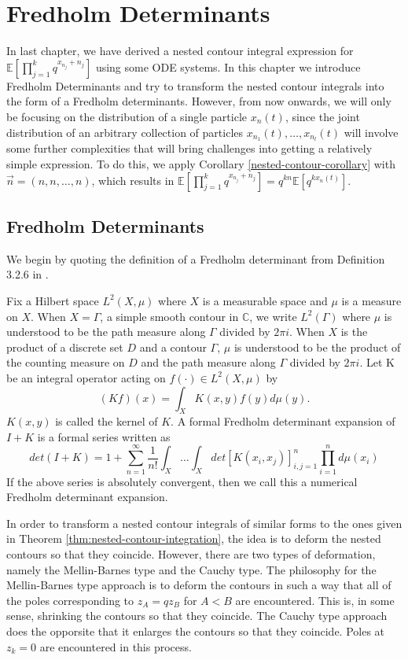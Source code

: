 \chapter{Fredholm Determinants}
In last chapter, we have derived a nested contour integral expression for $\mathbb{E}[\prod_{j=1}^k q^{x_{n_j}+n_j}]$ using some ODE systems. In this chapter we introduce Fredholm Determinants and try to transform the nested contour integrals into the form of a Fredholm determinants. However, from now onwards, we will only be focusing on the distribution of a single particle $x_n(t)$, since the joint distribution of an arbitrary collection of particles $x_{n_1}(t), \dots, x_{n_l}(t)$ will involve some further complexities that will bring challenges into getting a relatively simple expression. To do this, we apply Corollary \ref{nested-contour-corollary} with $\vec{n} = (n,n,\dots, n)$, which results in $\mathbb{E}[\prod_{j=1}^k q^{x_{n_j}+n_j}] = q^{kn} \mathbb{E} [q^{kx_n(t)}]$. 

\section{Fredholm Determinants}
We begin by quoting the definition of a Fredholm determinant from Definition 3.2.6 in \cite{macdonald2014}.

\begin{definition}
Fix a Hilbert space $L^2(X,\mu)$ where $X$ is a measurable space and $\mu$ is a measure on $X$. When $X = \Gamma$, a simple smooth contour in $\mathbb{C}$, we write $L^2(\Gamma)$ where $\mu$ is understood to be the path measure along $\Gamma$ divided by $2 \pi i$. When $X$ is the product of a discrete set $D$ and a contour $\Gamma$, $\mu$ is understood to be the product of the counting measure on $D$ and the path measure along $\Gamma$ divided by $2 \pi i$.
Let K be an integral operator acting on $f(\cdot) \in L^2(X,\mu)$ by $$(Kf)(x) = \int_X K(x,y) f(y) d\mu(y).$$ $K(x,y)$ is called the kernel of $K$. A formal Fredholm determinant expansion of $I+K$ is a formal series written as $$det(I+K) = 1 + \sum_{n=1}^{\infty} \frac{1}{n!} \int_X \dots \int_X det[K(x_i,x_j)]_{i,j=1}^{n} \prod_{i=1}^{n} d\mu(x_i)$$
If the above series is absolutely convergent, then we call this a numerical Fredholm determinant expansion.
\end{definition}

In order to transform a nested contour integrals of similar forms to the ones given in Theorem \ref{thm:nested-contour-integration}, the idea is to deform the nested contours so that they coincide. However, there are two types of deformation, namely the Mellin-Barnes type and the Cauchy type. The philosophy for the Mellin-Barnes type approach is to deform the contours in such a way that all of the poles corresponding to $z_A = qz_B$ for $A < B$ are encountered. This is, in some sense, shrinking the contours so that they coincide. The Cauchy type approach does the opporsite that it enlarges the contours so that they coincide. Poles at $z_k = 0$ are encountered in this process.

